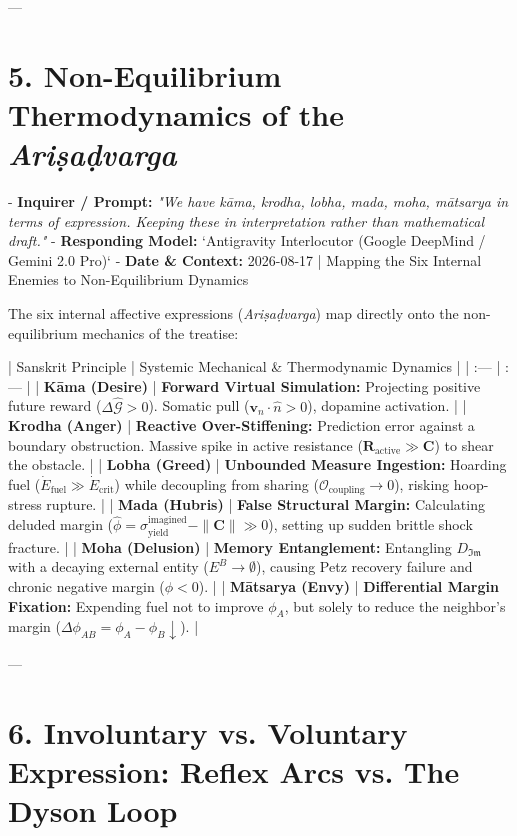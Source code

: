 \documentclass[11pt,a4paper]{article}
\theoremstyle{definition}
\theoremstyle{remark}
\begin{document}
---

\section{5. Non-Equilibrium Thermodynamics of the \textit{Ariṣaḍvarga}}

- \textbf{Inquirer / Prompt:} \textit{"We have kāma, krodha, lobha, mada, moha, mātsarya in terms of expression. Keeping these in interpretation rather than mathematical draft."}
- \textbf{Responding Model:} `Antigravity Interlocutor (Google DeepMind / Gemini 2.0 Pro)`
- \textbf{Date \& Context:} 2026-08-17 | Mapping the Six Internal Enemies to Non-Equilibrium Dynamics

The six internal affective expressions (\textit{Ariṣaḍvarga}) map directly onto the non-equilibrium mechanics of the treatise:

| Sanskrit Principle | Systemic Mechanical \& Thermodynamic Dynamics |
| :--- | :--- |
| \textbf{Kāma (Desire)} | \textbf{Forward Virtual Simulation:} Projecting positive future reward ($\Delta \hat{\mathcal{G}} > 0$). Somatic pull ($\mathbf{v}_n \cdot \hat{n} > 0$), dopamine activation. |
| \textbf{Krodha (Anger)} | \textbf{Reactive Over-Stiffening:} Prediction error against a boundary obstruction. Massive spike in active resistance ($\mathbf{R}_{\text{active}} \gg \mathbf{C}$) to shear the obstacle. |
| \textbf{Lobha (Greed)} | \textbf{Unbounded Measure Ingestion:} Hoarding fuel ($\dot{E}_{\text{fuel}} \gg \dot{E}_{\text{crit}}$) while decoupling from sharing ($\mathcal{O}_{\text{coupling}} \to 0$), risking hoop-stress rupture. |
| \textbf{Mada (Hubris)} | \textbf{False Structural Margin:} Calculating deluded margin ($\hat{\phi} = \sigma_{\text{yield}}^{\text{imagined}} - \|\mathbf{C}\| \gg 0$), setting up sudden brittle shock fracture. |
| \textbf{Moha (Delusion)} | \textbf{Memory Entanglement:} Entangling $D_{\mathfrak{Im}}$ with a decaying external entity ($E^B \to \emptyset$), causing Petz recovery failure and chronic negative margin ($\phi < 0$). |
| \textbf{Mātsarya (Envy)} | \textbf{Differential Margin Fixation:} Expending fuel not to improve $\phi_A$, but solely to reduce the neighbor's margin ($\Delta \phi_{AB} = \phi_A - \phi_B \downarrow$). |

---

\section{6. Involuntary vs. Voluntary Expression: Reflex Arcs vs. The Dyson Loop}
\end{document}
